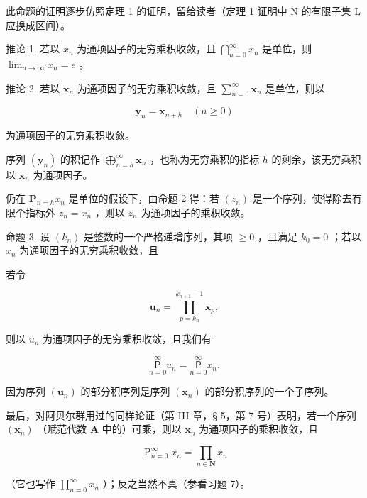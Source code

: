 此命题的证明逐步仿照定理 1 的证明，留给读者（定理 1 证明中 N 的有限子集 L 应换成区间）。

推论 1. 若以 \(x_{n}\) 为通项因子的无穷乘积收敛，且 \(\bigcap_{n=0}^{\infty}x_{n}\) 是单位，则 \(\lim_{n\to\infty}x_{n}=e\) 。

推论 2. 若以 \(\pmb{x}_n\) 为通项因子的无穷乘积收敛，且 \(\mathop{\sum }\limits_{{n = 0}}^{\infty}{\pmb{x}}_{n}\) 是单位，则以

\[
\mathbf {y} _ {n} = \mathbf {x} _ {n + h} \quad (n \geqslant 0)
\]

为通项因子的无穷乘积收敛。

序列 \((\mathbf{y}_n)\) 的积记作 \(\bigoplus_{n = h}^{\infty}\mathbf{x}_n\) ，也称为无穷乘积的指标 \(h\) 的剩余，该无穷乘积以 \(\mathbf{x}_n\) 为通项因子。

仍在 \(\mathbf{P}_{n=h} x_n\) 是单位的假设下，由命题 2 得：若 \((z_n)\) 是一个序列，使得除去有限个指标外 \(z_n = x_n\) ，则以 \(z_n\) 为通项因子的乘积收敛。

命题 3. 设 \((k_{n})\) 是整数的一个严格递增序列，其项 \(\geqslant 0\) ，且满足 \(k_{0} = 0\) ；若以 \(x_{n}\) 为通项因子的无穷乘积收敛，且

若令

\[
\boldsymbol {u} _ {n} = \prod_ {p = k _ {n}} ^ {k _ {n + 1} - 1} \boldsymbol {x} _ {p},
\]

则以 \(u_{n}\) 为通项因子的无穷乘积收敛，且我们有

\[
\underset {n = 0} {\overset {\infty} {\mathsf {P}}} u _ {n} = \underset {n = 0} {\overset {\infty} {\mathsf {P}}} x _ {n}.
\]

因为序列 \((\boldsymbol{u}_{n})\) 的部分积序列是序列 \((\boldsymbol{x}_{n})\) 的部分积序列的一个子序列。

最后，对阿贝尔群用过的同样论证（第 III 章，§ 5，第 7 号）表明，若一个序列 \((\pmb{x}_n)\) （赋范代数 \(\mathbf{A}\) 中的）可乘，则以 \(\pmb{x}_n\) 为通项因子的乘积收敛，且

\[
\mathop {\text { P }} _ {n = 0} ^ {\infty} x _ {n} = \prod_ {n \in \mathbf {N}} x _ {n}
\]

（它也写作 \(\prod_{n=0}^{\infty} x_n\) ）；反之当然不真（参看习题 7）。
